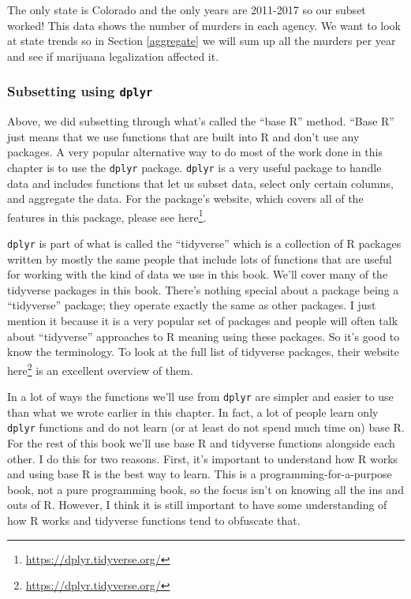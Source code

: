 \documentclass[
]{krantz}
\renewcommand{\href}[2]{#2\footnote{\url{#1}}}
\begin{document}
The only state is Colorado and the only years are 2011-2017
so our subset worked! This data shows the number of murders
in each agency. We want to look at state trends so in
Section \ref{aggregate} we will sum up all the murders per
year and see if marijuana legalization affected it.

\hypertarget{subsetting-using-dplyr}{%
\subsubsection{\texorpdfstring{Subsetting using
\texttt{dplyr}}{Subsetting using dplyr}}\label{subsetting-using-dplyr}}

Above, we did subsetting through what's called the ``base
R'' method. ``Base R'' just means that we use functions that
are built into R and don't use any packages. A very popular
alternative way to do most of the work done in this chapter
is to use the \texttt{dplyr} package. \texttt{dplyr} is a
very useful package to handle data and includes functions
that let us subset data, select only certain columns, and
aggregate the data. For the package's website, which covers
all of the features in this package, please see
\href{https://dplyr.tidyverse.org/}{here}.

\texttt{dplyr} is part of what is called the ``tidyverse''
which is a collection of R packages written by mostly the
same people that include lots of functions that are useful
for working with the kind of data we use in this book. We'll
cover many of the tidyverse packages in this book. There's
nothing special about a package being a ``tidyverse''
package; they operate exactly the same as other packages. I
just mention it because it is a very popular set of packages
and people will often talk about ``tidyverse'' approaches to
R meaning using these packages. So it's good to know the
terminology. To look at the full list of tidyverse packages,
their website \href{https://dplyr.tidyverse.org/}{here} is
an excellent overview of them.

In a lot of ways the functions we'll use from \texttt{dplyr}
are simpler and easier to use than what we wrote earlier in
this chapter. In fact, a lot of people learn only
\texttt{dplyr} functions and do not learn (or at least do
not spend much time on) base R. For the rest of this book
we'll use base R and tidyverse functions alongside each
other. I do this for two reasons. First, it's important to
understand how R works and using base R is the best way to
learn. This is a programming-for-a-purpose book, not a pure
programming book, so the focus isn't on knowing all the ins
and outs of R. However, I think it is still important to
have some understanding of how R works and tidyverse
functions tend to obfuscate that.
\end{document}

